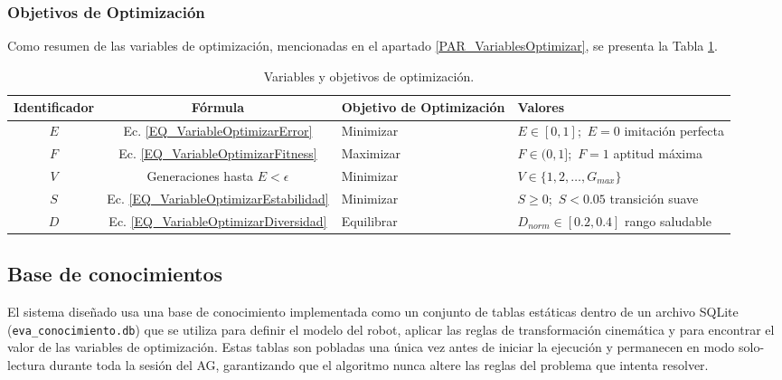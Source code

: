 
\subsubsection{Objetivos de Optimización}
Como resumen de las variables de optimización, mencionadas en el apartado \ref{PAR_VariablesOptimizar}, se presenta la Tabla \ref{TBL_ObjetivosOptimizacion}.

\begin{table}[H]
    \centering
    \begin{tabularx}{\textwidth}{|c|c|X|X|}
        \hline
        \textbf{Identificador} & \textbf{Fórmula} & \textbf{Objetivo de Optimización} & \textbf{Valores} \\
        \hline
        $E$ & Ec. \ref{EQ_VariableOptimizarError} & Minimizar & $E \in [0, 1]$;\ $E = 0$ imitación perfecta \\
        \hline
        $F$ & Ec. \ref{EQ_VariableOptimizarFitness} & Maximizar & $F \in (0, 1]$;\ $F = 1$ aptitud máxima \\
        \hline
        $V$ & Generaciones hasta $E < \epsilon$ & Minimizar & $V \in \{1, 2, \dots, G_{max}\}$ \\
        \hline
        $S$ & Ec. \ref{EQ_VariableOptimizarEstabilidad} & Minimizar & $S \geq 0$;\ $S < 0.05$ transición suave \\
        \hline
        $D$ & Ec. \ref{EQ_VariableOptimizarDiversidad} & Equilibrar & $D_{norm} \in [0.2, 0.4]$ rango saludable \\
        \hline
    \end{tabularx}
    \caption{Variables y objetivos de optimización.}
    \label{TBL_ObjetivosOptimizacion}
\end{table}



\subsection{Base de conocimientos}
El sistema diseñado usa una base de conocimiento implementada como un conjunto de tablas estáticas dentro de un archivo SQLite (\texttt{eva\_conocimiento.db}) que se utiliza para definir el modelo del robot, aplicar las reglas de transformación cinemática y para encontrar el valor de las variables de optimización. Estas tablas son pobladas una única vez antes de iniciar la ejecución y permanecen en modo solo-lectura durante toda la sesión del AG, garantizando que el algoritmo nunca altere las reglas del problema que intenta resolver.

